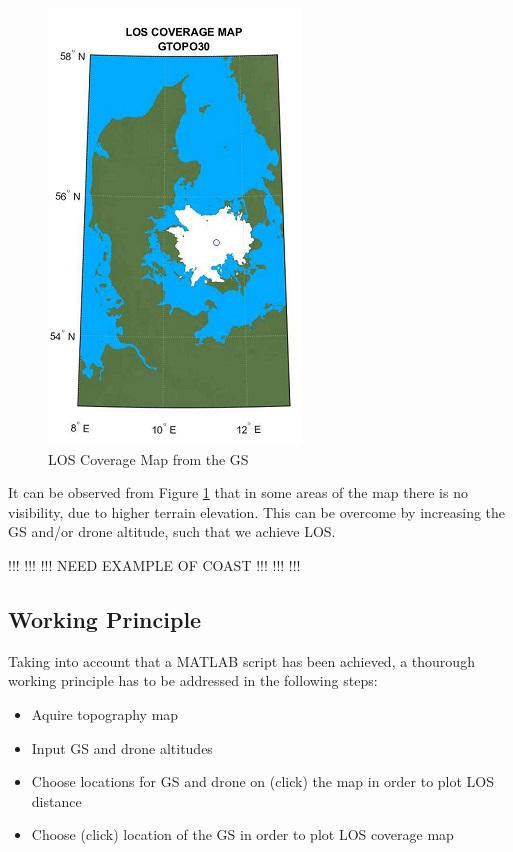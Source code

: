 \begin{figure}[h]
	\centering
	\includegraphics[scale=2.5]{figures/coverage_map.jpg}
	\caption{LOS Coverage Map from the GS}
   	\label{fig:los_area}
\end{figure}

It can be observed from Figure \ref{fig:los_area} that in some areas of the map there is no visibility, due to higher terrain elevation. This can be overcome by increasing the GS and/or drone altitude, such that we achieve LOS.  


!!! !!! !!! NEED EXAMPLE OF COAST !!! !!! !!!

\subsection{Working Principle}
Taking into account that a MATLAB script has been achieved, a thourough working principle has to be addressed in the following steps:
\begin{itemize}
	\item Aquire topography map 
	\item Input GS and drone altitudes
	\item Choose locations for GS and drone on (click) the map in order to plot LOS distance
	\item Choose (click) location of the GS in order to plot LOS coverage map
\end{itemize}